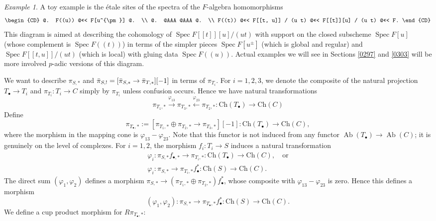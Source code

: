 \documentclass{amsart}
\theoremstyle{remark}
\newtheorem{Ex}[Thm]{Example}
\numberwithin{equation}{subsection}
\newcommand{\Ch}{\mathrm{Ch}}
\DeclareMathOperator{\Spec}{Spec}
\DeclareMathOperator{\Ab}{Ab}
\begin{document}
\begin{Ex}
	A toy example is the \'etale sites of the spectra of the $F$-algebra homomorphisms
		\[
			\begin{CD}
				@.
					F((u))
				@<<<
					F[u^{\pm}]
				@.
				\\ @. @AAA @AAA @. \\
					F((t))
				@<<<
					F[[t, u]] / (u t)
				@<<<
					F[[t]][u] / (u t)
				@<<<
					F.
			\end{CD}
		\]
	This diagram is aimed at describing the cohomology of $\Spec F[[t]][u] / (u t)$
	with support on the closed subscheme $\Spec F[u]$ (whose complement is $\Spec F((t))$)
	in terms of the simpler pieces $\Spec F[u^{\pm}]$ (which is global and regular) and
	$\Spec F[[t, u]] / (u t)$ (which is local)
	with gluing data $\Spec F((u))$.
	Actual examples we will see in Sections \ref{0297} and \ref{0303}
	will be more involved $p$-adic versions of this diagram.
\end{Ex}

We want to describe $\pi_{S, \ast}$ and
$\Bar{\pi}_{S, !} = [\Bar{\pi}_{S, \ast} \to \Bar{\pi}_{T, \ast}][-1]$
in terms of $\pi_{T_{i}}$.
For $i = 1, 2, 3$, we denote the composite of the natural projection $T_{\bullet} \to T_{i}$
and $\pi_{T_{i}} \colon T_{i} \to C$ simply by $\pi_{T_{i}}$ unless confusion occurs.
Hence we have natural transformations
	\[
			\pi_{T_{1}, \ast}
		\stackrel{\varphi_{13}}{\to}
			\pi_{T_{3}, \ast}
		\stackrel{\varphi_{23}}{\gets}
			\pi_{T_{2}, \ast}
		\colon
			\Ch(T_{\bullet})
		\to
			\Ch(C)
	\]
Define
	\begin{equation} \label{0399}
			\pi_{T_{\bullet}, \ast}
		:=
			[\pi_{T_{1}, \ast} \oplus \pi_{T_{2}, \ast} \to \pi_{T_{3}, \ast}][-1]
		\colon
			\Ch(T_{\bullet})
		\to
			\Ch(C),
	\end{equation}
where the morphism in the mapping cone is $\varphi_{13} - \varphi_{23}$.
Note that this functor is not induced from any functor $\Ab(T_{\bullet}) \to \Ab(C)$;
it is genuinely on the level of complexes.
For $i = 1, 2$, the morphism $f_{i} \colon T_{i} \to S$ induces a natural transformation
	\begin{gather*}
				\varphi_{i}
			\colon
				\pi_{S, \ast} f_{\bullet, \ast}
			\to
				\pi_{T_{i}, \ast}
			\colon
				\Ch(T_{\bullet})
			\to
				\Ch(C),
			\quad
				\text{or}
		\\
				\varphi_{i}
			\colon
				\pi_{S, \ast}
			\to
				\pi_{T_{i}, \ast}  f_{\bullet}^{\ast}
			\colon
				\Ch(S)
			\to
				\Ch(C).
	\end{gather*}
The direct sum $(\varphi_{1}, \varphi_{2})$ defines a morphism
$\pi_{S, \ast} \to (\pi_{T_{1}, \ast} \oplus \pi_{T_{2}, \ast}) f_{\bullet}^{\ast}$,
whose composite with $\varphi_{13} - \varphi_{23}$ is zero.
Hence this defines a morphism
	\begin{equation} \label{0387}
			(\varphi_{1}, \varphi_{2})
		\colon
			\pi_{S, \ast}
		\to
			\pi_{T_{\bullet}, \ast} f_{\bullet}^{\ast}
		\colon
			\Ch(S)
		\to
			\Ch(C).
	\end{equation}
We define a cup product morphism for $R \pi_{T_{\bullet}, \ast}$:
\end{document}
